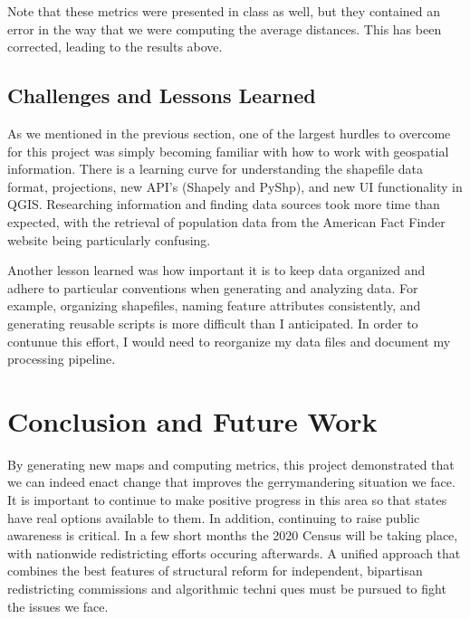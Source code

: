 \documentclass[11pt]{article}
\begin{document}
\medskip

Note that these metrics were presented in class as well, but they contained an error in the way that we were computing the average distances. This has been corrected, leading to the results above.

\subsection{Challenges and Lessons Learned}

As we mentioned in the previous section, one of the largest hurdles to overcome for this project was simply becoming familiar with how to work with geospatial information. There is a learning curve for understanding the shapefile data format, projections, new API's (Shapely and PyShp), and new UI functionality in QGIS. Researching information and finding data sources took more time than expected, with the retrieval of population data from the American Fact Finder website being particularly confusing.

\medskip

Another lesson learned was how important it is to keep data organized and adhere to particular conventions when generating and analyzing data. For example, organizing shapefiles, naming feature attributes consistently, and  generating reusable scripts is more difficult than I anticipated. In order to contunue this effort, I would need to reorganize my data files and document my processing pipeline.

\section{Conclusion and Future Work}

By generating new maps and computing metrics, this project demonstrated that we can indeed enact change that improves the gerrymandering situation we face. It is important to continue to make positive progress in this area so that states have real options available to them. In addition, continuing to raise public awareness is critical. In a few short months the 2020 Census will be taking place, with nationwide redistricting efforts occuring afterwards. A unified approach that combines the best features of structural reform for independent, bipartisan redistricting commissions and algorithmic techni	ques must be pursued to fight the issues we face.

\medskip
\end{document}
